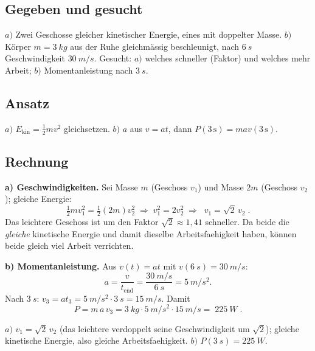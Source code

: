 
\subsection*{Gegeben und gesucht}
$a)$ Zwei Geschosse gleicher kinetischer Energie, eines mit doppelter
Masse. $b)$ Körper $m=\qty{3}{kg}$ aus der Ruhe gleichmässig
beschleunigt, nach $\qty{6}{s}$ Geschwindigkeit $\qty{30}{m/s}$.
Gesucht: $a)$ welches schneller (Faktor) und welches mehr Arbeit;
$b)$ Momentanleistung nach $\qty{3}{s}$.

\subsection*{Ansatz}
$a)$ $E_{\mathrm{kin}}=\tfrac12mv^2$ gleichsetzen. $b)$ $a$ aus
$v=at$, dann $P(3\,\mathrm s)=m a v(3\,\mathrm s)$.

\subsection*{Rechnung}
\textbf{a) Geschwindigkeiten.} Sei Masse $m$ (Geschoss $v_1$) und Masse
$2m$ (Geschoss $v_2$); gleiche Energie:
\begin{equation}
  \tfrac12 m v_1^2=\tfrac12 (2m)v_2^2\;\Rightarrow\;
  v_1^2=2v_2^2\;\Rightarrow\;
  \boxed{\;v_1=\sqrt2\,v_2\;}.
\end{equation}
Das leichtere Geschoss ist um den Faktor $\sqrt2\approx1{,}41$ schneller.
Da beide die \emph{gleiche} kinetische Energie und damit dieselbe
Arbeitsfaehigkeit haben, können beide gleich viel Arbeit verrichten.

\textbf{b) Momentanleistung.} Aus $v(t)=at$ mit $v(\qty{6}{s})=\qty{30}{m/s}$:
\begin{equation}
  a=\frac{v}{t_{\mathrm{end}}}=\frac{\qty{30}{m/s}}{\qty{6}{s}}=\qty{5}{m/s^2}.
\end{equation}
Nach $\qty{3}{s}$: $v_3=at_3=\qty{5}{m/s^2}\cdot\qty{3}{s}=\qty{15}{m/s}$. Damit
\begin{equation}
  P=m\,a\,v_3=\qty{3}{kg}\cdot\qty{5}{m/s^2}\cdot\qty{15}{m/s}=
  \boxed{\;\qty{225}{W}\;}.
\end{equation}

\begin{ergebnis}
$a)$ $v_1=\sqrt2\,v_2$ (das leichtere verdoppelt seine Geschwindigkeit um
$\sqrt2$); gleiche kinetische Energie, also gleiche Arbeitsfaehigkeit.
$b)$ $P(\qty{3}{s})=\qty{225}{W}$.
\end{ergebnis}

